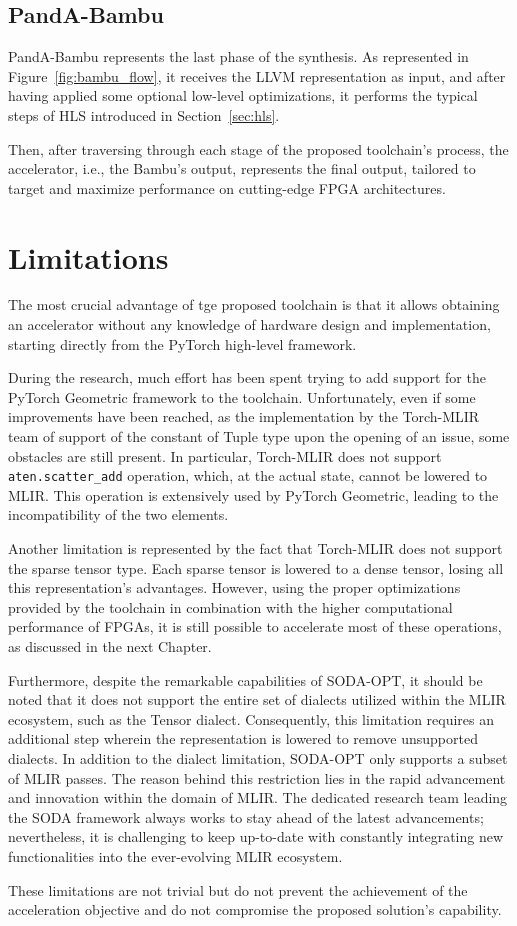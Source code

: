\subsection{PandA-Bambu}
\label{subsec:toolchain-panda_bambu}%

PandA-Bambu represents the last phase of the synthesis.
As represented in Figure~\ref{fig:bambu_flow}, it receives the LLVM representation as input, and after having applied some optional low-level optimizations, it performs the typical steps of HLS introduced in Section~\ref{sec:hls}.

Then, after traversing through each stage of the proposed toolchain's process, the accelerator, i.e., the Bambu's output, represents the final output, tailored to target and maximize performance on cutting-edge FPGA architectures.

\section{Limitations}
\label{sec:toolchain-limitations}%

The most crucial advantage of tge proposed toolchain is that it allows obtaining an accelerator without any knowledge of hardware design and implementation, starting directly from the PyTorch high-level framework.

During the research, much effort has been spent trying to add support for the PyTorch Geometric framework to the toolchain.
Unfortunately, even if some improvements have been reached, as the implementation by the Torch-MLIR team of support of the constant of Tuple type upon the opening of an issue, some obstacles are still present.
In particular, Torch-MLIR does not support \texttt{aten.scatter\_add} operation, which, at the actual state, cannot be lowered to MLIR\@.
This operation is extensively used by PyTorch Geometric, leading to the incompatibility of the two elements.

Another limitation is represented by the fact that Torch-MLIR does not support the sparse tensor type.
Each sparse tensor is lowered to a dense tensor, losing all this representation's advantages.
However, using the proper optimizations provided by the toolchain in combination with the higher computational performance of FPGAs, it is still possible to accelerate most of these operations, as discussed in the next Chapter.

Furthermore, despite the remarkable capabilities of SODA-OPT, it should be noted that it does not support the entire set of dialects utilized within the MLIR ecosystem, such as the Tensor dialect.
Consequently, this limitation requires an additional step wherein the representation is lowered to remove unsupported dialects.
In addition to the dialect limitation, SODA-OPT only supports a subset of MLIR passes.
The reason behind this restriction lies in the rapid advancement and innovation within the domain of MLIR\@.
The dedicated research team leading the SODA framework always works to stay ahead of the latest advancements; nevertheless, it is challenging to keep up-to-date with constantly integrating new functionalities into the ever-evolving MLIR ecosystem.

These limitations are not trivial but do not prevent the achievement of the acceleration objective and do not compromise the proposed solution's capability.